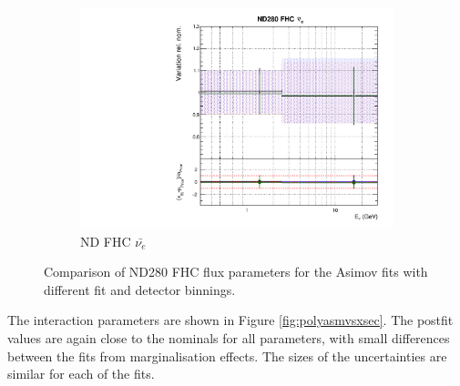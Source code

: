 \begin{figure}[!htbp]
\begin{subfigure}{0.49\textwidth}
  \includegraphics[width=0.99\linewidth]{figs/polyasmvsflux_3}
  \caption{ND FHC $\bar{\nu_{e}}$}
\end{subfigure}
\caption{Comparison of ND280 FHC flux parameters for the Asimov fits with different fit and detector binnings.}
\label{fig:polyasmvsfluxND}
\end{figure}

The interaction parameters are shown in Figure \ref{fig:polyasmvsxsec}. The postfit values are again close to the nominals for all parameters, with small differences between the fits from marginalisation effects. The sizes of the uncertainties are similar for each of the fits.

